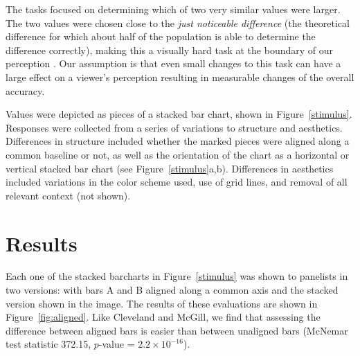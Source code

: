 \documentclass[10pt]{article}\usepackage[]{graphicx}\usepackage[table]{xcolor}
\begin{document}
The tasks focused on determining which of two very similar values were larger. The two values were chosen close to the \textit{just noticeable difference} (the theoretical difference for which about half of the population is able to determine the difference correctly), making this a visually hard task at the boundary of our perception \cite{lu2021jnd}. Our assumption is that even small changes to this task can have a large effect on a viewer's perception resulting in measurable changes of the overall accuracy.  %

Values were depicted as pieces of a stacked bar chart, shown in Figure~\ref{stimulus}. Responses were collected from a series of variations to structure and aesthetics. Differences in structure included whether the marked pieces were aligned along a common baseline or not, as well as the orientation of the chart as a horizontal or vertical stacked bar chart (see Figure~\ref{stimulus}a,b). Differences in aesthetics included variations in the color scheme used, use of grid lines, and removal of all relevant context (not shown). 
%
\section{Results}
Each one of the stacked barcharts in Figure~\ref{stimulus} was shown to panelists in two versions: with bars A and B aligned along a common axis and the stacked version shown in the image.  The results of these evaluations are shown in Figure~\ref{fig:aligned}. Like Cleveland and McGill, we find that assessing the difference between aligned bars is easier than between unaligned bars (McNemar test statistic 372.15, $p$-value = $2.2 \times 10^{-16}$).
\end{document}
